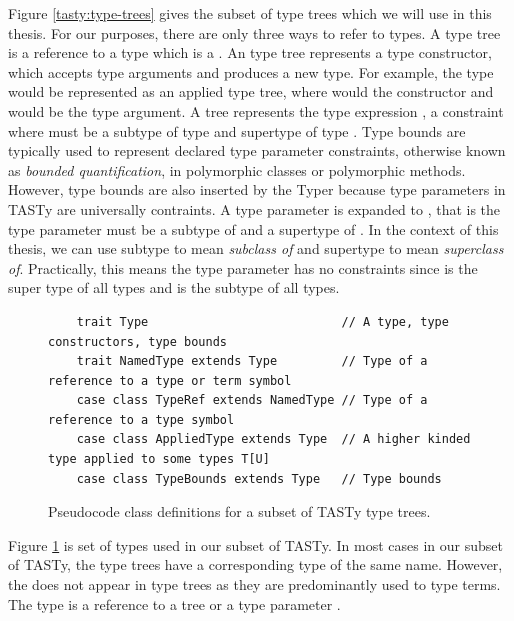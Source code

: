 Figure \ref{tasty:type-trees} gives the subset of type trees which we will use in this thesis.
For our purposes, there are only three ways to refer to types.
A  type tree is a reference to a type which is a .
An  type tree represents a type constructor, which accepts type arguments and produces a new type.
For example, the type  would be represented as an applied type tree, where  would the constructor and  would be the type argument.
A  tree represents the type expression , a constraint where  must be a subtype of type  and supertype of type .
Type bounds are typically used to represent declared type parameter constraints, otherwise known as \textit{bounded quantification}\cite{systemF:subtyping}, in polymorphic classes or polymorphic methods.
However, type bounds are also inserted by the Typer because type parameters in TASTy are universally contraints.
A type parameter  is expanded to , that is the type parameter  must be a subtype of  and a supertype of .
In the context of this thesis, we can use subtype to mean \textit{subclass of} and supertype to mean \textit{superclass of}.
Practically, this means the type parameter  has no constraints since  is the super type of all types and  is the subtype of all types.

\begin{figure}[!htb]
	\begin{verbatim}
	trait Type                           // A type, type constructors, type bounds
	trait NamedType extends Type         // Type of a reference to a type or term symbol
	case class TypeRef extends NamedType // Type of a reference to a type symbol
	case class AppliedType extends Type  // A higher kinded type applied to some types T[U]
	case class TypeBounds extends Type   // Type bounds
	\end{verbatim} 
	\caption{Pseudocode class definitions for a subset of TASTy type trees.}
	\label{tasty:types}
\end{figure}

Figure \ref{tasty:types} is set of types used in our subset of TASTy.
In most cases in our subset of TASTy, the type trees have a corresponding type of the same name.
However, the  does not appear in type trees as they are predominantly used to type terms.
The  type is a reference to a  tree or a type parameter .

